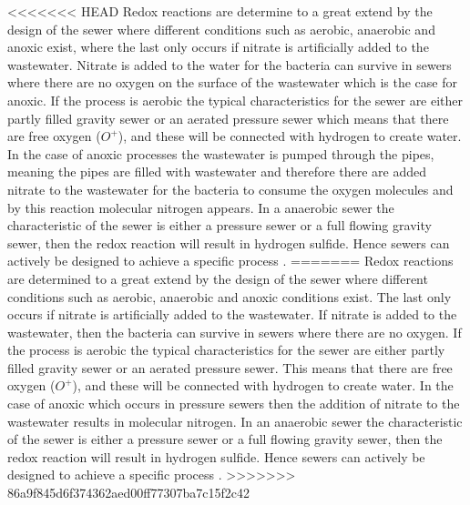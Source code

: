 <<<<<<< HEAD
Redox reactions are determine to a great extend by the design of the sewer where different conditions such as aerobic, anaerobic and anoxic exist, where the last only occurs if nitrate is artificially added to the wastewater. Nitrate is added to the water for the bacteria can survive in sewers where there are no oxygen on the surface of the wastewater which is the case for anoxic. If the process is aerobic the typical characteristics for the sewer are either partly filled gravity sewer or an aerated pressure sewer which means that there are free oxygen ($O^+$), and these will be connected with hydrogen to create water. In the case of anoxic processes the wastewater is pumped through the pipes, meaning the pipes are filled with wastewater and therefore there are added nitrate to the wastewater for the bacteria to consume the oxygen molecules and by this reaction molecular nitrogen appears. In a anaerobic sewer the characteristic of the sewer is either a pressure sewer or a full flowing gravity sewer, then the redox reaction will result in hydrogen sulfide. Hence sewers can actively be designed to achieve a specific process \cite{Sewer_processes}. 
=======
Redox reactions are determined to a great extend by the design of the sewer where different conditions such as aerobic, anaerobic and anoxic conditions exist. The last only occurs if nitrate is artificially added to the wastewater. If nitrate is added to the wastewater, then the bacteria can survive in sewers where there are no oxygen. If the process is aerobic the typical characteristics for the sewer are either partly filled gravity sewer or an aerated pressure sewer. This means that there are free oxygen ($O^+$), and these will be connected with hydrogen to create water. In the case of anoxic which occurs in pressure sewers then the addition of nitrate to the wastewater results in molecular nitrogen. In an anaerobic sewer the characteristic of the sewer is either a pressure sewer or a full flowing gravity sewer, then the redox reaction will result in hydrogen sulfide. Hence sewers can actively be designed to achieve a specific process \cite{Sewer_processes}. 
>>>>>>> 86a9f845d6f374362aed00ff77307ba7c15f2c42

